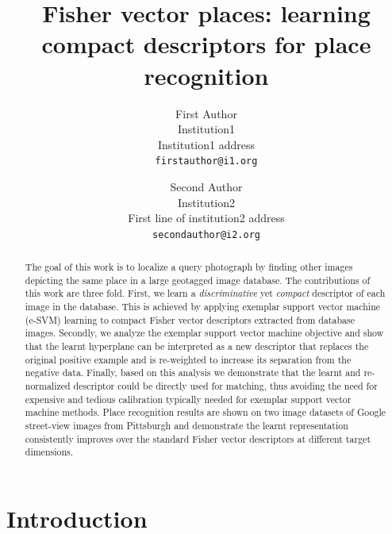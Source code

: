 \documentclass[10pt,twocolumn,letterpaper]{article}
\begin{document}
\title{Fisher vector places: learning compact descriptors for place recognition}

\author{First Author\\
Institution1\\
Institution1 address\\
{\tt\small firstauthor@i1.org}
\and
Second Author\\
Institution2\\
First line of institution2 address\\
{\tt\small secondauthor@i2.org}
}

\maketitle

\begin{abstract}
   The goal of this work is to localize a query photograph by finding other images depicting the same place in a large geotagged image database. The contributions of this work are three fold. First, we learn a {\em discriminative} yet {\em compact} descriptor of each image in the database. This is achieved by applying exemplar support vector machine (e-SVM) learning to compact Fisher vector descriptors extracted from database images. Secondly, we analyze the exemplar support vector machine objective and show that the learnt hyperplane can be interpreted as a new descriptor that replaces the original positive example and is re-weighted to increase its separation from the negative data. Finally, based on this analysis we demonstrate that the learnt and re-normalized descriptor could be directly used for matching, thus avoiding the need for expensive and tedious calibration typically needed for exemplar support vector machine methods. Place recognition results are shown on two image datasets of Google street-view images from Pittsburgh  and demonstrate the learnt representation consistently improves over the standard Fisher vector descriptors at different target dimensions. 
\end{abstract}

\section{Introduction}
\end{document}
